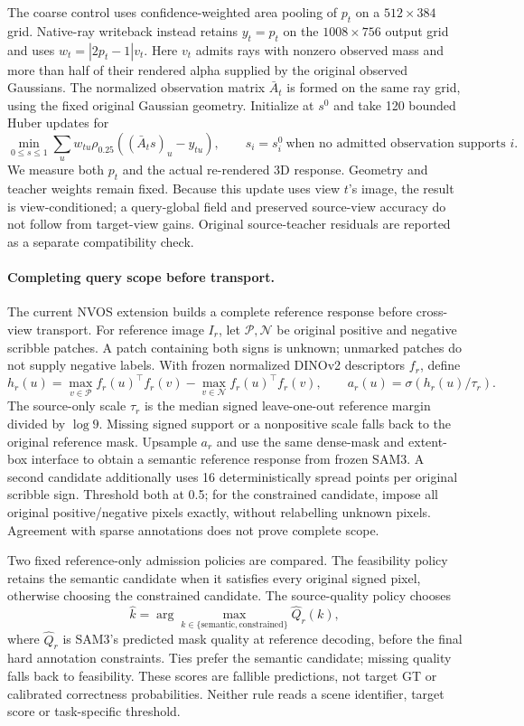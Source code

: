 The coarse control uses confidence-weighted area pooling of $p_t$ on a
$512\times384$ grid. Native-ray writeback instead retains $y_t=p_t$ on the
$1008\times756$ output grid and uses $w_t=|2p_t-1|v_t$. Here $v_t$ admits rays
with nonzero observed mass and more than half of their rendered alpha supplied
by the original observed Gaussians. The normalized observation matrix
$\bar A_t$ is formed on the same ray grid, using the fixed original Gaussian
geometry. Initialize at $s^0$ and take 120 bounded Huber updates for
\begin{equation}
 \min_{0\leq s\leq1}\sum_u w_{tu}\rho_{0.25}((\bar A_t s)_u-y_{tu}),
 \qquad s_i=s_i^0\ \text{when no admitted observation supports }i.
\end{equation}
We measure both $p_t$ and the actual re-rendered 3D response. Geometry and
teacher weights remain fixed. Because this update uses view $t$'s image,
the result is view-conditioned; a query-global field and preserved source-view
accuracy do not follow from target-view gains. Original source-teacher
residuals are reported as a separate compatibility check.

\paragraph{Completing query scope before transport.}
The current NVOS extension builds a complete reference response before cross-view
transport. For reference image $I_r$, let $\mathcal P,\mathcal N$ be original
positive and negative scribble patches. A patch containing both signs is unknown;
unmarked patches do not supply negative labels. With frozen normalized DINOv2
descriptors $f_r$, define
\[
 h_r(u)=\max_{v\in\mathcal P} f_r(u)^\top f_r(v)
       -\max_{v\in\mathcal N} f_r(u)^\top f_r(v),
 \qquad a_r(u)=\sigma(h_r(u)/\tau_r).
\]
The source-only scale $\tau_r$ is the median signed leave-one-out reference
margin divided by $\log9$. Missing signed support or a nonpositive scale falls
back to the original reference mask. Upsample $a_r$ and use the same dense-mask
and extent-box interface to obtain a semantic reference response from frozen
SAM3. A second candidate additionally uses 16 deterministically spread points
per original scribble sign. Threshold both at 0.5; for the constrained candidate,
impose all original positive/negative pixels exactly, without relabelling
unknown pixels. Agreement with sparse annotations does not prove complete scope.

Two fixed reference-only admission policies are compared. The feasibility policy
retains the semantic candidate when it satisfies every original signed pixel,
otherwise choosing the constrained candidate. The source-quality policy chooses
\[
 \hat k=\arg\max_{k\in\{\mathrm{semantic},\mathrm{constrained}\}}
             \widehat Q_r(k),
\]
where $\widehat Q_r$ is SAM3's predicted mask quality at reference decoding,
before the final hard annotation constraints. Ties prefer the semantic candidate;
missing quality falls back to feasibility. These scores are fallible predictions,
not target GT or calibrated correctness probabilities. Neither rule reads a
scene identifier, target score or task-specific threshold.

